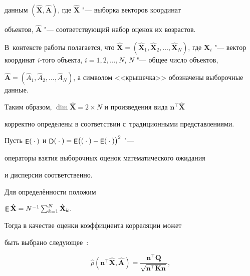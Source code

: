 данным $(\mathbf{\hat X},\mathbf{\hat A})$, где $\mathbf{\hat X}$ "--- выборка векторов координат 

объектов, $\mathbf{\hat A}$ "--- соответствующий набор оценок их возрастов.

В~контексте работы полагается, что  $\mathbf{\hat X} =(\mathbf{\hat X}_1,\mathbf{\hat X}_2,\ldots,\mathbf{\hat X}_N )$, где $\mathbf{X}_i$ "--- вектор координат $i$-того объекта, \linebreak $i=1, 2, \dots, N$, $N$ "--- общее число объектов, 

$\mathbf{\hat A}=(\hat A_1,\hat A_2,\ldots, \hat A_N)$, а символом  <<крышечка>> обозначены выборочные данные. 

Таким образом, $\dim \mathbf{\hat X}=2\times N$ и произведения вида $\mathbf{n}^\top \mathbf{\hat X}$

корректно определены в соответствии с~традиционными представлениями.



Пусть $ \mathop{\sf E}({}\cdot{})$ и $ \mathop{\sf D}({}\cdot{})= \mathop{\sf E}\bigl(({}\cdot{}) - \mathop{\sf E}({}\cdot{})\bigr)^2$  "---

операторы взятия выборочных оценок математического ожидания

и дисперсии соответственно.  

Для определённости положим

$\mathop{\sf E} \mathbf{\hat X}=N^{-1}\sum_{k=1}^N\mathbf{\hat X}_k$. 

Тогда в качестве оценки коэффициента корреляции может 

быть выбрано следующее~\cite{kislovbr:bib:kobzar}:




\begin{equation}

\hat{\rho}(\mathbf{n}^\top \mathbf{\hat X},\mathbf{\hat A})=\dfrac{\mathbf{n}^\top  \mathbf{Q}}{\sqrt{\mathbf{n}^\top \mathbf{K}\mathbf{n}}},

\label{eq:kislovbr:eq1}

\end{equation}

